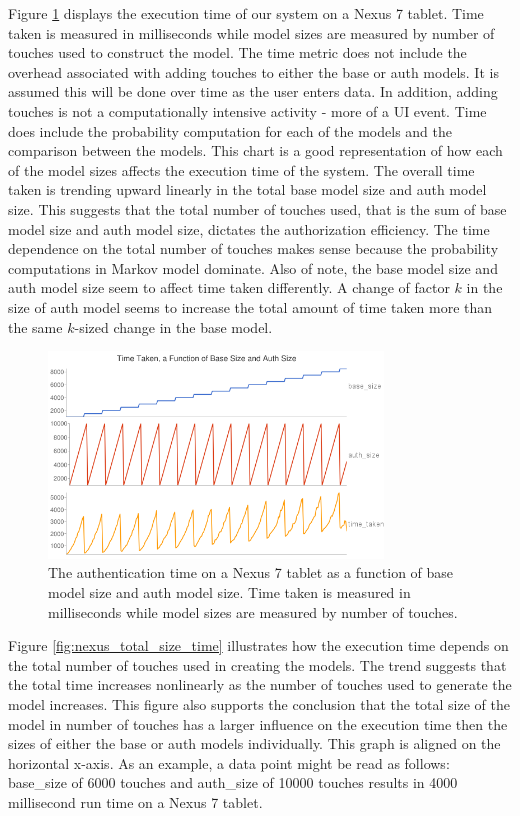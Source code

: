 \documentclass{acm_proc_article-sp}
\begin{document}
Figure \ref{fig:nexus_speed_test} displays the execution time of our system on a Nexus 7 tablet. Time taken is measured in milliseconds while model sizes are measured by number of touches used to construct the model. 
The time metric does not include the overhead associated with adding touches to either the base or auth models. It is assumed this will be done over time as the user enters data. In addition, adding touches is not a computationally intensive activity - more of a UI event. 
Time does include the probability computation for each of the models and the comparison between the models.
This chart is a good representation of how each of the model sizes affects the execution time of the system.
 The overall time taken is trending upward linearly in the total base model size and auth model size.
 This suggests that the total number of touches used, that is the sum of base model size and auth model size, dictates the authorization efficiency.
The time dependence on the total number of touches makes sense because the  probability computations in
Markov model dominate. 
Also of note, the base model size and auth model size seem to affect time taken differently. A change of 
factor $k$ in the size of auth model seems to increase the total amount of time taken more than the same $k$-sized change in the base model. 

\begin{figure}
\centering
\includegraphics[width=3.5in]{nexus_speed_test.png}
\caption{The authentication time on a Nexus 7 tablet as a function of base model size and auth model size. Time taken is measured in milliseconds while model sizes are measured by number of touches.}
\label{fig:nexus_speed_test}
\end{figure}

Figure \ref{fig:nexus_total_size_time} illustrates how the execution time depends on the total number of touches used in creating the models. The trend suggests that the total  time  increases 
nonlinearly as the number of touches used to generate the model increases.
This figure also supports the conclusion that the total size of the model in number of touches has a larger influence on the execution time then the sizes of either the base or auth models individually.
This graph is aligned on
the horizontal x-axis. As an example, a data point
might be read as follows: base\_size of 6000
touches and auth\_size of 10000 touches results in
4000 millisecond run time on a Nexus 7 tablet.
\end{document}
